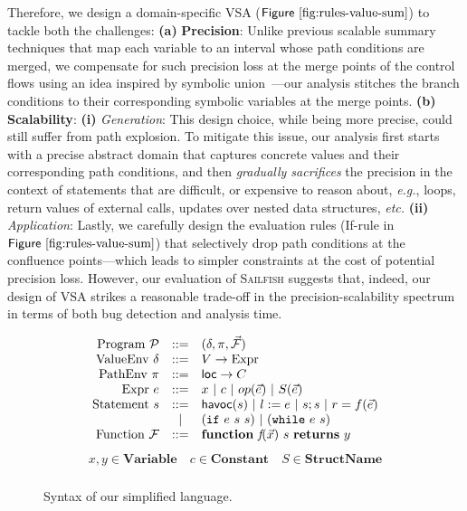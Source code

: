 \documentclass[conference, romanappendices]{tex/IEEEtran}
\theoremstyle{bfnote}
\newcommand{\toolname}{\textsc{Sailfish}\xspace}
\newcommand{\etc}{\textit{etc.}}
\newcommand{\eg}{\textit{e.g.}}
\newcommand{\Fig}[1]{\ensuremath{\sf Figure~\ref{#1}}}
\newcommand{\contract}{\mathcal{P}}
\newcommand{\valEnv}{\delta}
\newcommand{\pathEnv}{\pi}
\newcommand{\func}{\mathcal{F}}
\begin{document}
Therefore, we design a domain-specific VSA (\Fig{fig:rules-value-sum}) to tackle both the challenges:
\textbf{(a)} \textbf{Precision}:
Unlike previous scalable summary techniques that map each variable to an interval whose path conditions are merged,
we compensate for such precision loss at the merge points of the control flows using an idea inspired by symbolic union~\cite{rosette}---our analysis stitches the branch conditions to their corresponding symbolic variables at the merge points.
\textbf{(b)} \textbf{Scalability}:
\textbf{(i)} \textit{Generation}: This design choice, while being more precise, could still suffer from path explosion.
To mitigate this issue, our analysis first starts with a precise abstract domain that captures concrete values and their corresponding path conditions, and then \emph{gradually sacrifices} the precision in the context of statements that are difficult, or expensive to reason about, \eg, loops, return values of external calls, updates over nested data structures, \etc{}
\textbf{(ii)} \textit{Application}:
Lastly, we carefully design the evaluation rules (If-rule in \Fig{fig:rules-value-sum}) that selectively drop path conditions at the confluence points---which leads to simpler constraints at the cost of potential precision loss.
However, our evaluation of \toolname suggests that, indeed, our design of VSA strikes a reasonable trade-off in the precision-scalability spectrum in terms of both bug detection and analysis time.

\begin{figure}[!t]
\small
\[
\begin{array}{rcl}
    \text{Program }    \contract  &::=& (\valEnv, \pathEnv, \vec{\func}) \\
    \text{ValueEnv }  \valEnv &::=& V \to \text{Expr} \\
    \text{PathEnv }    \pathEnv   &::=& \mathsf{loc} \to C \\
    \text{Expr }    e &::=& x ~|~ c ~|~ op(\vec{e}) ~|~ S(\vec{e}) \\
    \text{Statement }  s &::=& \mathsf{havoc}(s) ~|~ l := e ~|~ s; s  ~|~ r=f(\vec{e}) \\
    &|  & (\mathtt{if} \ e \ s \ s) ~|~ (\mathtt{while} \ e \ s) \\
    \text{Function }   \func &::=& {\bf function} ~ \emph{f}(\vec{x}) ~ s ~ {\bf returns} ~ y \\   
\end{array}
\]
\[
\begin{array}{c}
x, y \in \textbf{Variable} \quad c \in \textbf{Constant} \quad S \in \textbf{StructName} \\
\end{array}
\]
\vspace{-7mm}
\caption{\small Syntax of our simplified language.}
\label{fig:syntax-ir}
\vspace{-8mm}
\end{figure}
\end{document}
